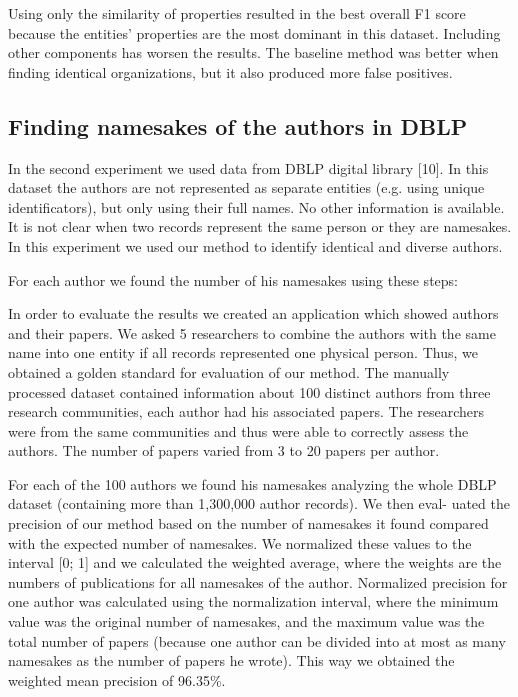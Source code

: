 \documentclass{llncs}
\begin{document}
Using only the similarity of properties resulted in the best overall F1 score
because the entities' properties are the most dominant in this dataset. Including
other components has worsen the results. The baseline method was better when
finding identical organizations, but it also produced more false positives.

\subsection {Finding namesakes of the authors in DBLP}
In the second experiment we used data from DBLP digital library [10]. In this
dataset the authors are not represented as separate entities (e.g. using unique
identificators), but only using their full names. No other information is available.
It is not clear when two records represent the same person or they are namesakes.
In this experiment we used our method to identify identical and diverse authors.

For each author we found the number of his namesakes using these steps:

In order to evaluate the results we created an application which showed
authors and their papers. We asked 5 researchers to combine the authors with
the same name into one entity if all records represented one physical person.
Thus, we obtained a golden standard for evaluation of our method. The manually
processed dataset contained information about 100 distinct authors from three
research communities, each author had his associated papers. The researchers
were from the same communities and thus were able to correctly assess the
authors. The number of papers varied from 3 to 20 papers per author.

For each of the 100 authors we found his namesakes analyzing the whole
DBLP dataset (containing more than 1,300,000 author records). We then eval-
uated the precision of our method based on the number of namesakes it found
compared with the expected number of namesakes. We normalized these values
to the interval [0; 1] and we calculated the weighted average, where the weights
are the numbers of publications for all namesakes of the author. Normalized
precision for one author was calculated using the normalization interval, where
the minimum value was the original number of namesakes, and the maximum
value was the total number of papers (because one author can be divided into
at most as many namesakes as the number of papers he wrote). This way we
obtained the weighted mean precision of 96.35\%.
\end{document}
